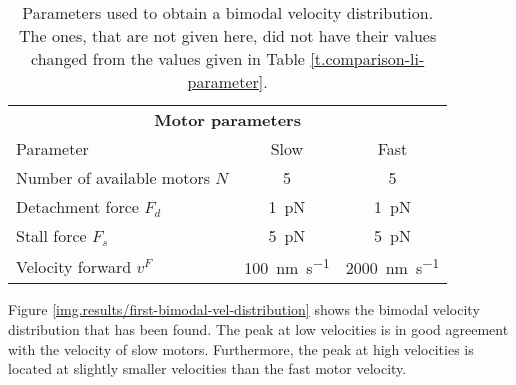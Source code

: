 \renewcommand{\arraystretch}{1.5}
\begin{table}[h]
\centering
\caption[Simulation parameters for bimodal velocity distribution obtained by the explicit model]{Parameters used to obtain a bimodal velocity distribution. The ones, that are not given here, did not have their values changed from the values given in Table \ref{t.comparison-li-parameter}.}
\label{t.bimodal-parameters}
\begin{tabular}{|l||c|c|} \hline
\multicolumn{3}{|c|}{\textbf{Motor parameters}} \\
Parameter & Slow & Fast \\ \hline \hline
Number of available motors $N$ & 5 & 5 \\ \hline
Detachment force $F_d$ & \SI{1}{\pico\newton} & \SI{1}{\pico\newton} \\ \hline
Stall force $F_s$ & \SI{5}{\pico\newton} & \SI{5}{\pico\newton} \\ \hline
Velocity forward $v^F$ & \SI[per-mode=fraction]{100}{\nano\metre\per\second} & \SI[per-mode=fraction]{2000}{\nano\metre\per\second} \\ \hline
\end{tabular}
\end{table}
\renewcommand{\arraystretch}{1}

Figure \ref{img.results/first-bimodal-vel-distribution} shows the bimodal velocity distribution that has been found. The peak at low velocities is in good agreement with the velocity of slow
motors. Furthermore, the peak at high velocities is located at slightly smaller velocities than the fast motor velocity.


